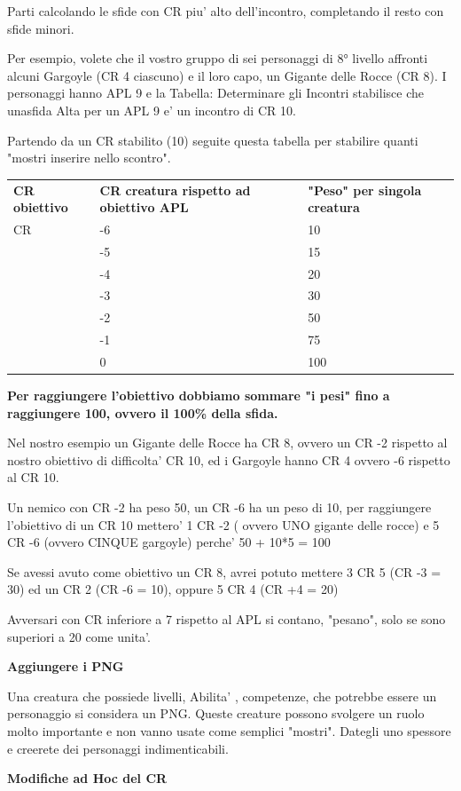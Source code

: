 \documentclass[a4paper,11pt,twoside,openany]{book}
\begin{document}
{Parti calcolando le sfide con CR piu' alto dell'incontro, completando il resto con sfide minori.

Per esempio, volete che il vostro gruppo di sei personaggi di 8° livello affronti alcuni Gargoyle (CR 4 ciascuno) e il loro capo, un Gigante delle Rocce (CR 8). I personaggi hanno APL 9 e la Tabella: Determinare gli Incontri stabilisce che unasfida Alta per un APL 9 e' un incontro di CR 10.

Partendo da un CR stabilito (10) seguite questa tabella per stabilire quanti "mostri inserire nello scontro".

\bigskip

\begin{tabular}{lll}
\toprule
\textbf{CR obiettivo} & \textbf{CR creatura rispetto ad obiettivo APL} & \textbf{"Peso" per singola creatura}\tabularnewline
CR & -6 & 10\tabularnewline
 & -5 & 15\tabularnewline
 & -4 & 20\tabularnewline
 & -3 & 30\tabularnewline
 & -2 & 50\tabularnewline
 & -1 & 75\tabularnewline
 & 0 & 100\tabularnewline
\end{tabular}

\bigskip

\textbf{Per raggiungere l'obiettivo dobbiamo sommare "i pesi"
fino a raggiungere 100, ovvero il 100\% della sfida.}

Nel nostro esempio un Gigante delle Rocce ha CR 8, ovvero un CR -2 rispetto al nostro obiettivo di difficolta' CR 10, ed i Gargoyle hanno CR 4 ovvero -6 rispetto al CR 10.

Un nemico con CR -2 ha peso 50, un CR -6 ha un peso di 10, per raggiungere l'obiettivo di un CR 10 mettero' 1 CR -2 ( ovvero UNO gigante delle rocce) e 5 CR -6 (ovvero CINQUE gargoyle) perche' 50 + 10{*}5 = 100

Se avessi avuto come obiettivo un CR 8, avrei potuto mettere 3 CR 5 (CR -3 = 30) ed un CR 2 (CR -6 = 10), oppure 5 CR 4 (CR +4 = 20)

Avversari con CR inferiore a 7 rispetto al APL si contano, "pesano", solo se sono superiori a 20 come unita'.

\textbf{Aggiungere i PNG}

Una creatura che possiede livelli, Abilita' , competenze, che potrebbe essere un personaggio si considera un PNG. Queste creature possono svolgere un ruolo molto importante e non vanno usate come semplici "mostri". Dategli uno spessore e creerete dei personaggi indimenticabili.

\textbf{Modifiche ad Hoc del CR}

}
\end{document}
